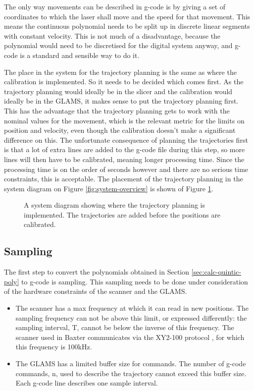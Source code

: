 The only way movements can be described in g-code is by giving a set of coordinates to which the laser shall move and the speed for that movement. This means the continuous polynomial needs to be split up in discrete linear segments with constant velocity. This is not much of a disadvantage, because the polynomial would need to be discretised for the digital system anyway, and g-code is a standard and sensible way to do it.

The place in the system for the trajectory planning is the same as where the calibration is implemented. So it needs to be decided which comes first. As the trajectory planning would ideally be in the slicer and the calibration would ideally be in the GLAMS, it makes sense to put the trajectory planning first. This has the advantage that the trajectory planning gets to work with the nominal values for the movement, which is the relevant metric for the limits on position and velocity, even though the calibration doesn't make a significant difference on this. The unfortunate consequence of planning the trajectories first is that a lot of extra lines are added to the g-code file during this step, so more lines will then have to be calibrated, meaning longer processing time. Since the processing time is on the order of seconds however and there are no serious time constraints, this is acceptable. The placement of the trajectory planning in the system diagram on Figure \ref{fig:system-overview} is shown of Figure \ref{fig:system-overview-w-cal-traj}.

\begin{figure}
    \centering
    
    \caption{A system diagram showing where the trajectory planning is implemented. The trajectories are added before the positions are calibrated.}
    \label{fig:system-overview-w-cal-traj}
\end{figure}

\subsection{Sampling} \label{sec:trajectory-sampling}
The first step to convert the polynomials obtained in Section \ref{sec:calc-quintic-poly} to g-code is sampling. This sampling needs to be done under consideration of the hardware constraints of the scanner and the GLAMS.

\begin{itemize}
    \item The scanner has a max frequency at which it can read in new positions. The sampling frequency can not be above this limit, or expressed differently: the sampling interval, T, cannot be below the inverse of this frequency. The scanner used in Baxter communicates via the XY2-100 protocol \cite{scanner-spec}, for which this frequency is 100kHz.
    \item The GLAMS has a limited buffer size for commands. The number of g-code commands, n, used to describe the trajectory cannot exceed this buffer size. Each g-code line describes one sample interval.
\end{itemize}

